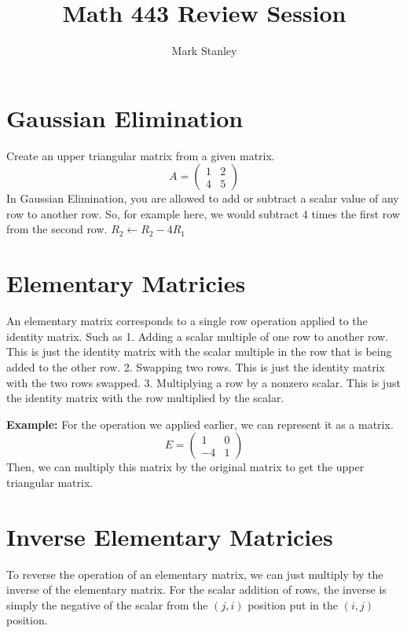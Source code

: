 \documentclass[11pt]{article}
\author{Mark Stanley}
\title{Math 443 Review Session}
\begin{document}
    \lstset{style=mystyle}

    \maketitle

    \section{Gaussian Elimination}
    Create an upper triangular matrix from a given matrix.
    \[A=\begin{pmatrix}1 & 2 \\ 4 & 5\end{pmatrix}\]
    In Gaussian Elimination, you are allowed to add or subtract a scalar value of any row to another row.
    So, for example here, we would subtract 4 times the first row from the second row. $R_2 \leftarrow R_2 - 4R_1$

    \section{Elementary Matricies}
    An elementary matrix corresponds to a single row operation applied to the identity matrix. Such as
    1.
    Adding a scalar multiple of one row to another row.
    This is just the identity matrix with the scalar multiple in the row that is being added to the other row.
    2.
    Swapping two rows.
    This is just the identity matrix with the two rows swapped.
    3.
    Multiplying a row by a nonzero scalar.
    This is just the identity matrix with the row multiplied by the scalar.

    \textbf{Example:}
    For the operation we applied earlier, we can represent it as a matrix.
    \[E = \begin{pmatrix}1 & 0 \\ -4 & 1\end{pmatrix}\]
    Then, we can multiply this matrix by the original matrix to get the upper triangular matrix.

    \section{Inverse Elementary Matricies}
    To reverse the operation of an elementary matrix, we can just multiply by the inverse of the elementary matrix.
    For the scalar addition of rows, the inverse is simply the negative of the scalar from the $(j, i)$ position put in
    the $(i, j)$ position.
\end{document}
